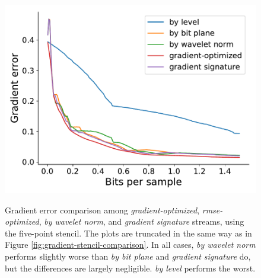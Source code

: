 \begin{figure}
	{\includegraphics[width=0.48\linewidth]{img/gradient/5points/gradient-optimized-velocityz.pdf}}
	\caption{Gradient error comparison among \emph{gradient-optimized}, \emph{rmse-optimized},
	\emph{by wavelet norm}, and \emph{gradient signature} streams, using the five-point stencil. The
	plots are truncated in the same way as in Figure \ref{fig:gradient-stencil-comparison}. In all
	cases, \emph{by wavelet norm} performs slightly worse than \emph{by bit plane} and \emph{gradient
	signature} do, but the differences are largely negligible. \emph{by level} performs the worst.}
	\label{fig:gradient-error-comparison}
\end{figure}

